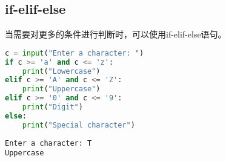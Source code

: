 \subsection{if-elif-else}

当需要对更多的条件进行判断时，可以使用if-elif-else语句。\\


\begin{lstlisting}[language=Python]
c = input("Enter a character: ")
if c >= 'a' and c <= 'z':
	print("Lowercase")
elif c >= 'A' and c <= 'Z':
	print("Uppercase")
elif c >= '0' and c <= '9':
	print("Digit")
else:
	print("Special character")
\end{lstlisting}

\begin{tcolorbox}
	\begin{verbatim}
Enter a character: T
Uppercase
\end{verbatim}
\end{tcolorbox}

\newpage